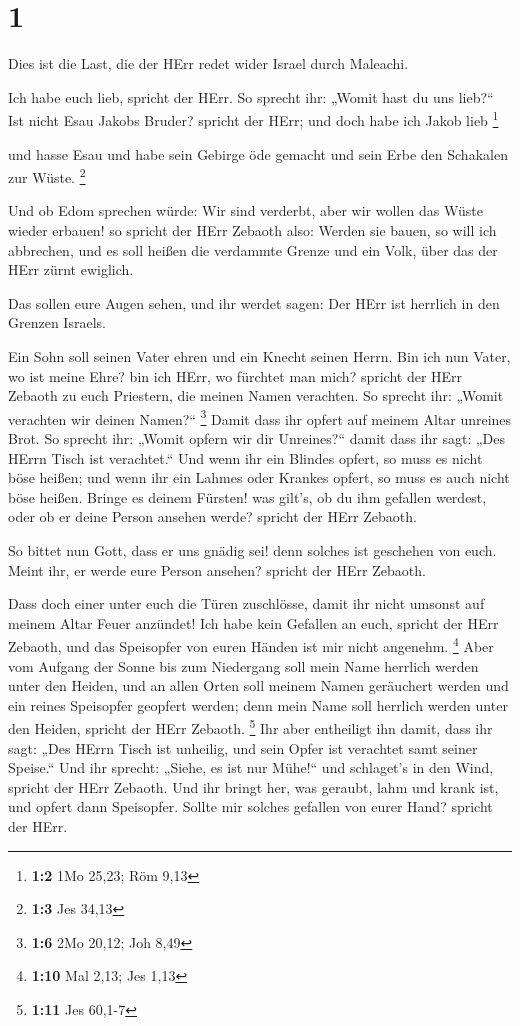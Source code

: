 \hypertarget{section}{%
\section{1}\label{section}}

 Dies ist die Last, die der HErr redet wider Israel durch
Maleachi.

 Ich habe euch lieb, spricht der HErr. So sprecht ihr:
„Womit hast du uns lieb?{}`` Ist nicht Esau Jakobs Bruder? spricht der
HErr; und doch habe ich Jakob lieb \footnote{\textbf{1:2} 1Mo 25,23; Röm
  9,13}

 und hasse Esau und habe sein Gebirge öde gemacht und sein
Erbe den Schakalen zur Wüste. \footnote{\textbf{1:3} Jes 34,13}

 Und ob Edom sprechen würde: Wir sind verderbt, aber wir
wollen das Wüste wieder erbauen! so spricht der HErr Zebaoth also:
Werden sie bauen, so will ich abbrechen, und es soll heißen die
verdammte Grenze und ein Volk, über das der HErr zürnt ewiglich.

 Das sollen eure Augen sehen, und ihr werdet sagen: Der HErr
ist herrlich in den Grenzen Israels.

 Ein Sohn soll seinen Vater ehren und ein Knecht seinen
Herrn. Bin ich nun Vater, wo ist meine Ehre? bin ich HErr, wo fürchtet
man mich? spricht der HErr Zebaoth zu euch Priestern, die meinen Namen
verachten. So sprecht ihr: „Womit verachten wir deinen Namen?{}``
\footnote{\textbf{1:6} 2Mo 20,12; Joh 8,49}  Damit dass ihr
opfert auf meinem Altar unreines Brot. So sprecht ihr: „Womit opfern wir
dir Unreines?{}`` damit dass ihr sagt: „Des HErrn Tisch ist verachtet.``
 Und wenn ihr ein Blindes opfert, so muss es nicht böse
heißen; und wenn ihr ein Lahmes oder Krankes opfert, so muss es auch
nicht böse heißen. Bringe es deinem Fürsten! was gilt's, ob du ihm
gefallen werdest, oder ob er deine Person ansehen werde? spricht der
HErr Zebaoth.

 So bittet nun Gott, dass er uns gnädig sei! denn solches
ist geschehen von euch. Meint ihr, er werde eure Person ansehen? spricht
der HErr Zebaoth.

 Dass doch einer unter euch die Türen zuschlösse, damit ihr
nicht umsonst auf meinem Altar Feuer anzündet! Ich habe kein Gefallen an
euch, spricht der HErr Zebaoth, und das Speisopfer von euren Händen ist
mir nicht angenehm. \footnote{\textbf{1:10} Mal 2,13; Jes 1,13}
 Aber vom Aufgang der Sonne bis zum Niedergang soll mein
Name herrlich werden unter den Heiden, und an allen Orten soll meinem
Namen geräuchert werden und ein reines Speisopfer geopfert werden; denn
mein Name soll herrlich werden unter den Heiden, spricht der HErr
Zebaoth. \footnote{\textbf{1:11} Jes 60,1-7}  Ihr aber
entheiligt ihn damit, dass ihr sagt: „Des HErrn Tisch ist unheilig, und
sein Opfer ist verachtet samt seiner Speise.``  Und ihr
sprecht: „Siehe, es ist nur Mühe!{}`` und schlaget's in den Wind,
spricht der HErr Zebaoth. Und ihr bringt her, was geraubt, lahm und
krank ist, und opfert dann Speisopfer. Sollte mir solches gefallen von
eurer Hand? spricht der HErr.

